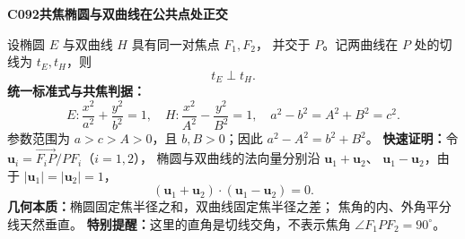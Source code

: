 \textbf{C092\quad 共焦椭圆与双曲线在公共点处正交}

设椭圆 $E$ 与双曲线 $H$ 具有同一对焦点 $F_1,F_2$，
并交于 $P$。记两曲线在 $P$ 处的切线为 $t_E,t_H$，则
\[
\boxed{t_E\perp t_H}.
\]
\textbf{统一标准式与共焦判据：}
\[E:\frac{x^2}{a^2}+\frac{y^2}{b^2}=1,\quad
H:\frac{x^2}{A^2}-\frac{y^2}{B^2}=1,\quad
\boxed{a^2-b^2=A^2+B^2=c^2}.\]
参数范围为 $a>c>A>0$，且 $b,B>0$；因此 $\boxed{a^2-A^2=b^2+B^2}$。
\textbf{快速证明：}令 $\mathbf u_i=\overrightarrow{F_iP}/PF_i$（$i=1,2$），
椭圆与双曲线的法向量分别沿 $\mathbf u_1+\mathbf u_2$、
$\mathbf u_1-\mathbf u_2$，由于 $|\mathbf u_1|=|\mathbf u_2|=1$，
\[
(\mathbf u_1+\mathbf u_2)\cdot(\mathbf u_1-\mathbf u_2)=0.
\]
\textbf{几何本质：}椭圆固定焦半径之和，双曲线固定焦半径之差；
焦角的内、外角平分线天然垂直。
\textbf{特别提醒：}这里的直角是切线交角，不表示焦角 $\angle F_1PF_2=90^\circ$。
